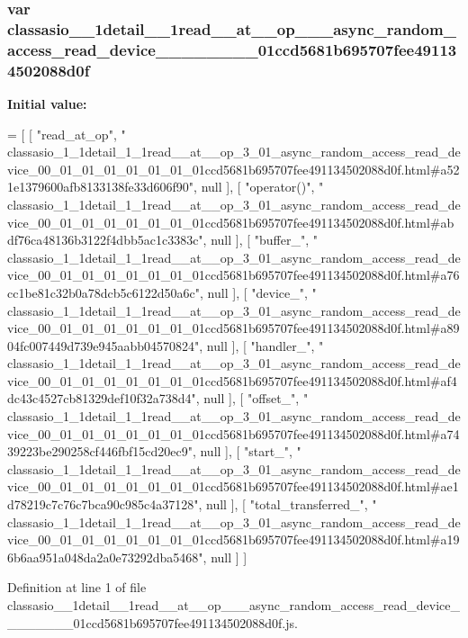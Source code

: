 \subsubsection[{classasio\+\_\+1\+\_\+1detail\+\_\+1\+\_\+1read\+\_\+\+\_\+at\+\_\+\+\_\+op\+\_\+3\+\_\+01\+\_\+async\+\_\+random\+\_\+access\+\_\+read\+\_\+device\+\_\+00\+\_\+01\+\_\+01\+\_\+01\+\_\+01\+\_\+01\+\_\+01\+\_\+01ccd5681b695707fee491134502088d0f}]{\setlength{\rightskip}{0pt plus 5cm}var classasio\+\_\+\_\+1detail\+\_\+\_\+1read\+\_\+\+\_\+at\+\_\+\+\_\+op\+\_\+\_\+\_\+async\+\_\+random\+\_\+access\+\_\+read\+\_\+device\+\_\+\_\+\_\+\_\+\_\+\_\+\_\+\_\+01ccd5681b695707fee491134502088d0f}\label{classasio__1__1detail__1__1read____at____op__3__01__async__random__access__read__device__00__01_b0cf066b5be2821834538bcd332fc7e3_a244fdc7eafe564d5a28b164db5c6790d}
{\bfseries Initial value\+:}
\begin{DoxyCode}
=
[
    [ \textcolor{stringliteral}{"read\_at\_op"}, \textcolor{stringliteral}{"
      classasio\_1\_1detail\_1\_1read\_\_at\_\_op\_3\_01\_async\_random\_access\_read\_device\_00\_01\_01\_01\_01\_01\_01\_01ccd5681b695707fee491134502088d0f.html#a521e1379600afb8133138fe33d606f90"}, null ],
    [ \textcolor{stringliteral}{"operator()"}, \textcolor{stringliteral}{"
      classasio\_1\_1detail\_1\_1read\_\_at\_\_op\_3\_01\_async\_random\_access\_read\_device\_00\_01\_01\_01\_01\_01\_01\_01ccd5681b695707fee491134502088d0f.html#abdf76ca48136b3122f4dbb5ac1c3383c"}, null ],
    [ \textcolor{stringliteral}{"buffer\_"}, \textcolor{stringliteral}{"
      classasio\_1\_1detail\_1\_1read\_\_at\_\_op\_3\_01\_async\_random\_access\_read\_device\_00\_01\_01\_01\_01\_01\_01\_01ccd5681b695707fee491134502088d0f.html#a76cc1be81c32b0a78dcb5c6122d50a6c"}, null ],
    [ \textcolor{stringliteral}{"device\_"}, \textcolor{stringliteral}{"
      classasio\_1\_1detail\_1\_1read\_\_at\_\_op\_3\_01\_async\_random\_access\_read\_device\_00\_01\_01\_01\_01\_01\_01\_01ccd5681b695707fee491134502088d0f.html#a8904fc007449d739e945aabb04570824"}, null ],
    [ \textcolor{stringliteral}{"handler\_"}, \textcolor{stringliteral}{"
      classasio\_1\_1detail\_1\_1read\_\_at\_\_op\_3\_01\_async\_random\_access\_read\_device\_00\_01\_01\_01\_01\_01\_01\_01ccd5681b695707fee491134502088d0f.html#af4dc43c4527cb81329def10f32a738d4"}, null ],
    [ \textcolor{stringliteral}{"offset\_"}, \textcolor{stringliteral}{"
      classasio\_1\_1detail\_1\_1read\_\_at\_\_op\_3\_01\_async\_random\_access\_read\_device\_00\_01\_01\_01\_01\_01\_01\_01ccd5681b695707fee491134502088d0f.html#a7439223be290258cf446fbf15cd20ec9"}, null ],
    [ \textcolor{stringliteral}{"start\_"}, \textcolor{stringliteral}{"
      classasio\_1\_1detail\_1\_1read\_\_at\_\_op\_3\_01\_async\_random\_access\_read\_device\_00\_01\_01\_01\_01\_01\_01\_01ccd5681b695707fee491134502088d0f.html#ae1d78219c7c76c7bca90c985c4a37128"}, null ],
    [ \textcolor{stringliteral}{"total\_transferred\_"}, \textcolor{stringliteral}{"
      classasio\_1\_1detail\_1\_1read\_\_at\_\_op\_3\_01\_async\_random\_access\_read\_device\_00\_01\_01\_01\_01\_01\_01\_01ccd5681b695707fee491134502088d0f.html#a196b6aa951a048da2a0e73292dba5468"}, null ]
]
\end{DoxyCode}


Definition at line 1 of file classasio\+\_\+\_\+1detail\+\_\+\_\+1read\+\_\+\+\_\+at\+\_\+\+\_\+op\+\_\+\_\+\_\+async\+\_\+random\+\_\+access\+\_\+read\+\_\+device\+\_\+\_\+\_\+\_\+\_\+\_\+\_\+\_\+01ccd5681b695707fee491134502088d0f.\+js.

